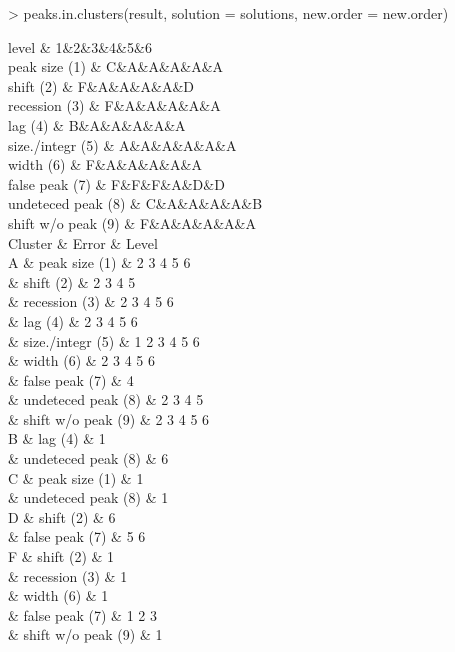 \documentclass[a4paper]{article}
\begin{document}
\begin{Schunk}
\begin{Sinput}
> peaks.in.clusters(result, solution = solutions, new.order = new.order)
\end{Sinput}
\begin{Soutput}
level & 1&2&3&4&5&6 \\
\hline
peak size (1) & C&A&A&A&A&A \\
shift (2) & F&A&A&A&A&D \\
recession (3) & F&A&A&A&A&A \\
lag (4) & B&A&A&A&A&A \\
size./integr (5) & A&A&A&A&A&A \\
width (6) & F&A&A&A&A&A \\
false peak (7) & F&F&F&A&D&D \\
undeteced peak (8) & C&A&A&A&A&B \\
shift w/o peak (9) & F&A&A&A&A&A \\


Cluster & Error & Level\\
A & peak size (1) & 2  3  4  5  6  \\
 & shift (2) & 2  3  4  5  \\
 & recession (3) & 2  3  4  5  6  \\
 & lag (4) & 2  3  4  5  6  \\
 & size./integr (5) & 1  2  3  4  5  6  \\
 & width (6) & 2  3  4  5  6  \\
 & false peak (7) & 4  \\
 & undeteced peak (8) & 2  3  4  5  \\
 & shift w/o peak (9) & 2  3  4  5  6  \\
B & lag (4) & 1  \\
 & undeteced peak (8) & 6  \\
C & peak size (1) & 1  \\
 & undeteced peak (8) & 1  \\
D & shift (2) & 6  \\
 & false peak (7) & 5  6  \\
F & shift (2) & 1  \\
 & recession (3) & 1  \\
 & width (6) & 1  \\
 & false peak (7) & 1  2  3  \\
 & shift w/o peak (9) & 1  \\
\end{Soutput}
\end{Schunk}
\end{document}
